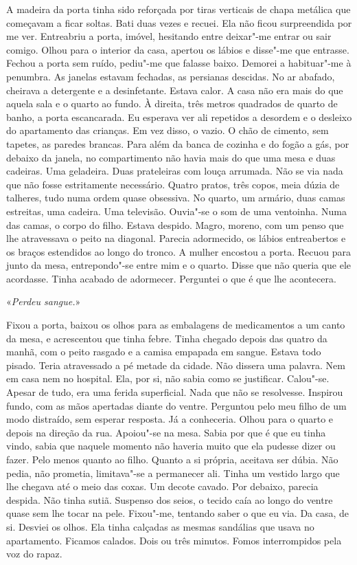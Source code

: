 A madeira da porta tinha sido reforçada por tiras verticais de chapa
metálica que começavam a ficar soltas. Bati duas vezes e recuei. Ela não
ficou surpreendida por me ver. Entreabriu a porta, imóvel, hesitando
entre deixar"-me entrar ou sair comigo. Olhou para o interior da casa,
apertou os lábios e disse"-me que entrasse. Fechou a porta sem ruído,
pediu"-me que falasse baixo. Demorei a habituar"-me à penumbra. As
janelas estavam fechadas, as persianas descidas. No ar abafado, cheirava a
detergente e a desinfetante. Estava calor. A casa não era mais do que
aquela sala e o quarto ao fundo. À direita, três metros quadrados de
quarto de banho, a porta escancarada. Eu esperava ver ali repetidos a
desordem e o desleixo do apartamento das crianças. Em vez disso, o
vazio. O chão de cimento, sem tapetes, as paredes brancas. Para além da
banca de cozinha e do fogão a gás, por debaixo da janela, no
compartimento não havia mais do que uma mesa e duas cadeiras. Uma
geladeira. Duas prateleiras com louça arrumada. Não se via nada que
não fosse estritamente necessário. Quatro pratos, três copos, meia dúzia
de talheres, tudo numa ordem quase obsessiva. No quarto, um armário,
duas camas estreitas, uma cadeira. Uma televisão. Ouvia"-se o som de uma
ventoinha. Numa das camas, o corpo do filho. Estava despido. Magro,
moreno, com um penso que lhe atravessava o peito na diagonal. Parecia
adormecido, os lábios entreabertos e os braços estendidos ao longo do
tronco. A mulher encostou a porta. Recuou para junto da mesa,
entrepondo"-se entre mim e o quarto. Disse que não queria que ele
acordasse. Tinha acabado de adormecer. Perguntei o que é que lhe
acontecera.

«\emph{Perdeu sangue.}»

Fixou a porta, baixou os olhos para as embalagens de medicamentos a um
canto da mesa, e acrescentou que tinha febre. Tinha chegado depois das
quatro da manhã, com o peito rasgado e a camisa empapada em sangue.
Estava todo pisado. Teria atravessado a pé metade da cidade. Não dissera
uma palavra. Nem em casa nem no hospital. Ela, por si, não sabia como se
justificar. Calou"-se. Apesar de tudo, era uma ferida superficial. Nada
que não se resolvesse. Inspirou fundo, com as mãos apertadas diante do
ventre. Perguntou pelo meu filho de um modo distraído, sem esperar
resposta. Já a conheceria. Olhou para o quarto e depois na direção da
rua. Apoiou"-se na mesa. Sabia por que é que eu tinha vindo, sabia que
naquele momento não haveria muito que ela pudesse dizer ou fazer. Pelo
menos quanto ao filho. Quanto a si própria, aceitava ser dúbia. Não
pedia, não prometia, limitava"-se a permanecer ali. Tinha um vestido
largo que lhe chegava até o meio das coxas. Um decote cavado. Por
debaixo, parecia despida. Não tinha sutiã. Suspenso dos seios, o tecido
caía ao longo do ventre quase sem lhe tocar na pele. Fixou"-me, tentando
saber o que eu via. Da casa, de si. Desviei os olhos. Ela tinha calçadas
as mesmas sandálias que usava no apartamento. Ficamos calados. Dois ou
três minutos. Fomos interrompidos pela voz do rapaz.

